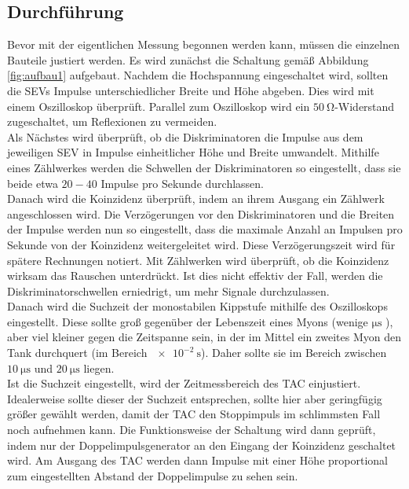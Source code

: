 \subsection{Durchführung}
\label{sec:durchführung}

Bevor mit der eigentlichen Messung begonnen werden kann, müssen die einzelnen Bauteile justiert werden.
Es wird zunächst die Schaltung gemäß Abbildung \ref{fig:aufbau1} aufgebaut.
Nachdem die Hochspannung eingeschaltet wird, sollten die SEVs Impulse unterschiedlicher Breite und Höhe abgeben.
Dies wird mit einem Oszilloskop überprüft.
Parallel zum Oszilloskop wird ein $\SI{50}{\ohm}$-Widerstand zugeschaltet, um Reflexionen zu vermeiden.\\
Als Nächstes wird überprüft, ob die Diskriminatoren die Impulse aus dem jeweiligen SEV in Impulse einheitlicher Höhe und Breite umwandelt.
Mithilfe eines Zählwerkes werden die Schwellen der Diskriminatoren so eingestellt, dass sie beide etwa $20-40$ Impulse pro Sekunde durchlassen.\\
Danach wird die Koinzidenz überprüft, indem an ihrem Ausgang ein Zählwerk angeschlossen wird.
Die Verzögerungen vor den Diskriminatoren und die Breiten der Impulse werden nun so eingestellt, dass die maximale Anzahl an Impulsen pro Sekunde von der Koinzidenz weitergeleitet wird.
Diese Verzögerungszeit wird für spätere Rechnungen notiert.
Mit Zählwerken wird überprüft, ob die Koinzidenz wirksam das Rauschen unterdrückt.
Ist dies nicht effektiv der Fall, werden die Diskriminatorschwellen erniedrigt, um mehr Signale durchzulassen.\\
Danach wird die Suchzeit der monostabilen Kippstufe mithilfe des Oszilloskops eingestellt.
Diese sollte groß gegenüber der Lebenszeit eines Myons (wenige $\si{\micro\second}$ \cite{Agashe:2014kda}), aber viel kleiner gegen die Zeitspanne sein, in der im Mittel ein zweites Myon den Tank durchquert (im Bereich $\SI{e-2}{\second}$).
Daher sollte sie im Bereich zwischen $\SI{10}{\micro\second}$ und $\SI{20}{\micro\second}$ liegen.\\
Ist die Suchzeit eingestellt, wird der Zeitmessbereich des TAC einjustiert.
Idealerweise sollte dieser der Suchzeit entsprechen, sollte hier aber geringfügig größer gewählt werden, damit der TAC den Stoppimpuls im schlimmsten Fall noch aufnehmen kann.
Die Funktionsweise der Schaltung wird dann geprüft, indem nur der Doppelimpulsgenerator an den Eingang der Koinzidenz geschaltet wird.
Am Ausgang des TAC werden dann Impulse mit einer Höhe proportional zum eingestellten Abstand der Doppelimpulse zu sehen sein.
